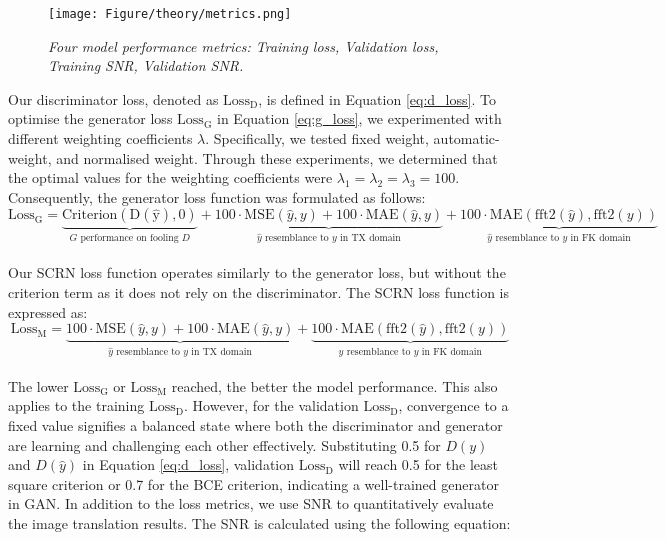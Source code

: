 \begin{figure}[ht]
	\centering
	\texttt{[image: Figure/theory/metrics.png]} %
	\caption{\textit{Four model performance metrics: Training loss, Validation loss, Training SNR, Validation SNR.}}
	\label{fig:metrics}
\end{figure}

\noindent Our discriminator loss, denoted as $\mathrm{Loss_{D}}$, is defined in Equation \ref{eq:d_loss}. To optimise the generator loss $\mathrm{Loss_{G}}$ in Equation \ref{eq:g_loss}, we experimented with different weighting coefficients $\lambda$. Specifically, we tested fixed weight, automatic-weight, and normalised weight. Through these experiments, we determined that the optimal values for the weighting coefficients were $\lambda_1 = \lambda_2 = \lambda_3 = 100$. Consequently, the generator loss function was formulated as follows:
\begin{equation}
	\mathrm{Loss_{G}}= \underbrace{\mathrm{Criterion(D(\hat{y}),0)}}_{\text{$G$ performance on fooling $D$}} + \underbrace{100 \cdot \mathrm{MSE}(\hat{y}, y) + 100 \cdot \mathrm{MAE}(\hat{y}, y)}_{\text{$\hat{y}$ resemblance to $y$ in TX domain}} + \underbrace{100 \cdot \mathrm{MAE}(\text{fft2}(\hat{y}), \text{fft2}(y))}_{\text{$\hat{y}$ resemblance to $y$ in FK domain}}
	\label{eq:g_loss_100}
\end{equation}
\\
Our SCRN loss function operates similarly to the generator loss, but without the criterion term as it does not rely on the discriminator. The SCRN loss function is expressed as:
\begin{equation}
	\mathrm{Loss_{M}}= \underbrace{100 \cdot \mathrm{MSE}(\hat{y}, y) + 100 \cdot \mathrm{MAE}(\hat{y}, y)}_{\text{$\hat{y}$ resemblance to $y$ in TX domain}} + \underbrace{100 \cdot \mathrm{MAE}(\text{fft2}(\hat{y}), \text{fft2}(y))}_{\text{$\hat{y}$ resemblance to $y$ in FK domain}}
	\label{eq:m_loss_100}
\end{equation}
\\ 
The lower $\mathrm{Loss_{G}}$ or $\mathrm{Loss_{M}}$ reached, the better the model performance. This also applies to the training $\mathrm{Loss_{D}}$. However, for the validation $\mathrm{Loss_{D}}$, convergence to a fixed value signifies a balanced state where both the discriminator and generator are learning and challenging each other effectively. Substituting 0.5 for $D(y)$ and $D(\hat{y})$ in Equation \ref{eq:d_loss}, validation $\mathrm{Loss_{D}}$ will reach 0.5 for the least square criterion or 0.7 for the BCE criterion, indicating a well-trained generator in GAN. In addition to the loss metrics, we use SNR to quantitatively evaluate the image translation results. The SNR is calculated using the following equation:
